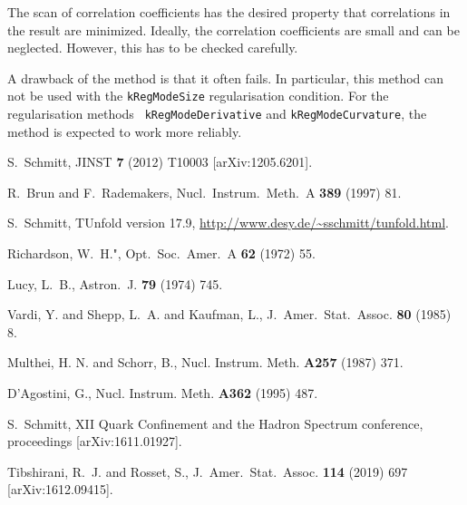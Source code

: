 \documentclass[12pt]{article}
\newcommand{\tunfoldmajor}{17}
\newcommand{\tunfoldminor}{9}
\newcommand{\tunfoldversion}{{\tunfoldmajor{}.\tunfoldminor}}
\begin{document}
The scan of correlation coefficients has the desired property that
correlations in the result are minimized. Ideally, the correlation
coefficients are small and can be neglected. However, this has to be
checked carefully.

A drawback of the method is that it often fails. In particular, this
method can not be used with the {\tt kRegModeSize}
regularisation condition. For the regularisation methods {\tt
  kRegModeDerivative} and {\tt kRegModeCurvature}, the method is
expected to work more reliably.


\begin{flushleft}
\begin{thebibliography}{99}

  S.~Schmitt,
  JINST {\bf 7} (2012) T10003
  [arXiv:1205.6201].

  R.~Brun and F.~Rademakers,
  Nucl.\ Instrum.\ Meth.\  A {\bf 389} (1997) 81.

S.~Schmitt, TUnfold version \tunfoldversion, 
\url{http://www.desy.de/~sschmitt/tunfold.html}.

  Richardson, W.\ H.",
  Opt.\ Soc.\ Amer.\ A {\bf 62} (1972) 55.

  Lucy, L.\ B.,
  Astron.\ J. {\bf 79} (1974) 745.

  Vardi, Y. and Shepp, L.\ A. and Kaufman, L.,
  J.\ Amer.\ Stat.\ Assoc. {\bf 80} (1985) 8.

  Multhei, H. N. and Schorr, B.,
  Nucl. Instrum. Meth. {\bf A257} (1987) 371.

  D'Agostini, G.,
  Nucl. Instrum. Meth. {\bf A362} (1995) 487.

S.~Schmitt, XII Quark Confinement and the Hadron
Spectrum conference, proceedings [arXiv:1611.01927].

  Tibshirani, R.\ J. and Rosset, S.,
  J.\ Amer.\ Stat.\ Assoc. {\bf 114} (2019) 697
    [arXiv:1612.09415].

\end{thebibliography}
\end{flushleft}
\end{document}
